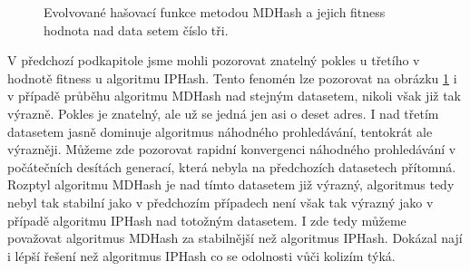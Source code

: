 \begin{figure}[!ht]
	\centering
	\caption{Evolvované hašovací funkce metodou MDHash a jejich fitness hodnota nad data setem číslo tři.}
	\label{fig:MDComparison3}
\end{figure}

V předchozí podkapitole jsme mohli pozorovat znatelný pokles u třetího v hodnotě fitness u algoritmu IPHash. Tento fenomén lze
pozorovat na obrázku \ref{fig:MDComparison3} i v případě průběhu algoritmu MDHash nad stejným datasetem, nikoli však již
tak výrazně. Pokles je znatelný, ale už se jedná jen asi o deset adres. I nad třetím datasetem jasně dominuje algoritmus náhodného
prohledávání, tentokrát ale výrazněji. Můžeme zde pozorovat rapidní konvergenci náhodného prohledávání v počátečních desítách
generací, která nebyla na předchozích datasetech přítomná. Rozptyl algoritmu MDHash je nad tímto datasetem již výrazný, algoritmus
tedy nebyl tak stabilní jako v předchozím případech není však tak výrazný jako v případě algoritmu IPHash nad totožným datasetem.
I zde tedy můžeme považovat algoritmus MDHash za stabilnější než algoritmus IPHash. Dokázal nají i lépší řešení než algoritmus
IPHash co se odolnosti vůči kolizím týká.

